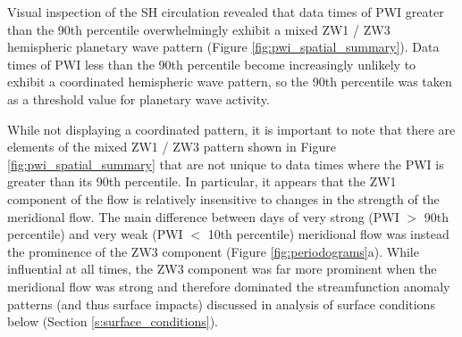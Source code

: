 Visual inspection of the SH circulation revealed that data times of PWI greater than the 90th percentile overwhelmingly exhibit a mixed ZW1 / ZW3 hemispheric planetary wave pattern (Figure \ref{fig:pwi_spatial_summary}). Data times of PWI less than the 90th percentile become increasingly unlikely to exhibit a coordinated hemispheric wave pattern, so the 90th percentile was taken as a threshold value for planetary wave activity. 

While not displaying a coordinated pattern, it is important to note that there are elements of the mixed ZW1 / ZW3 pattern shown in Figure \ref{fig:pwi_spatial_summary} that are not unique to data times where the PWI is greater than its 90th percentile. In particular, it appears that the ZW1 component of the flow is relatively insensitive to changes in the strength of the meridional flow. The main difference between days of very strong (PWI $>$ 90th percentile) and very weak (PWI $<$ 10th percentile) meridional flow was instead the prominence of the ZW3 component (Figure \ref{fig:periodograms}a). While influential at all times, the ZW3 component was far more prominent when the meridional flow was strong and therefore dominated the streamfunction anomaly patterns (and thus surface impacts) discussed in analysis of surface conditions below (Section \ref{s:surface_conditions}). 

